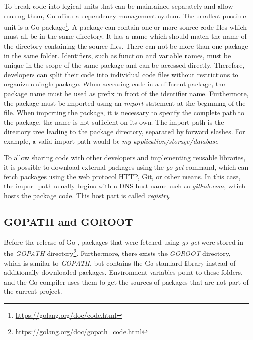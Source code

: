 To break code into logical units that can be maintained separately and allow reusing them, Go offers a dependency
management system.
The smallest possible unit is a Go package\footnote{\url{https://golang.org/doc/code.html}}.
A package can contain one or more source code files which must all be in the same directory.
It has a name which should match the name of the directory containing the source files.
There can not be more than one package in the same folder.
Identifiers, such as function and variable names, must be unique in the scope of the same package and can be accessed
directly.
Therefore, developers can split their code into individual code files without restrictions to organize a single package.
When accessing code in a different package, the package name must be used as prefix in front of the identifier name.
Furthermore, the package must be imported using an \textit{import} statement at the beginning of the file.
When importing the package, it is necessary to specify the complete path to the package, the name is not sufficient on
its own.
The import path is the directory tree leading to the package directory, separated by forward slashes.
For example, a valid import path would be \textit{my-application/storage/database}.

To allow sharing code with other developers and implementing reusable libraries, it is possible to download external
packages using the \textit{go get} command, which can fetch packages using the web protocol \acrshort{HTTP}, Git, or
other means.
In this case, the import path usually begins with a \acrshort{DNS} host name such as \textit{github.com}, which hosts
the package code.
This host part is called \textit{registry}.



\subsection{GOPATH and GOROOT}\label{subsec:background:dependencies:gopath}

Before the release of Go , packages that were fetched using \textit{go get} were stored in the
\textit{GOPATH} directory\footnote{\url{https://golang.org/doc/gopath_code.html}}.
Furthermore, there exists the \textit{GOROOT} directory, which is similar to \textit{GOPATH}, but contains the Go
standard library instead of additionally downloaded packages.
Environment variables point to these folders, and the Go compiler uses them to get the sources of packages that are not
part of the current project.

